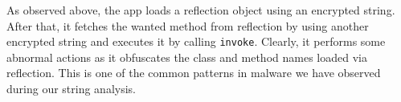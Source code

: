 As observed above, the app loads a reflection object using an encrypted string.
After that, it fetches the wanted method from reflection by using another encrypted string 
and executes it by calling \texttt{invoke}.
Clearly, it performs some abnormal actions as it obfuscates
the class and method names loaded via reflection. This is one of the common patterns in
malware we have observed during our string analysis.


